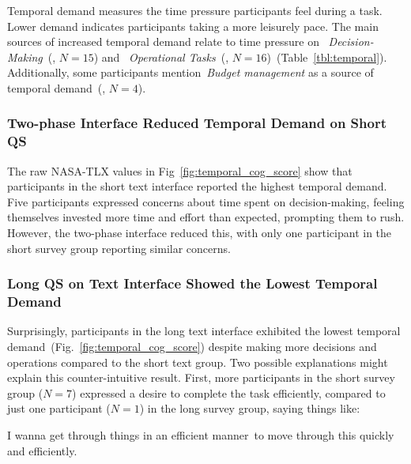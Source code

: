Temporal demand measures the time pressure participants feel during a task. Lower demand indicates participants taking a more leisurely pace. The main sources of increased temporal demand relate to time pressure on ~\textit{Decision-Making}~(, $N=15$) and ~\textit{Operational Tasks}~(, $N=16$)~(Table~\ref{tbl:temporal}). Additionally, some participants mention~\textit{Budget management} as a source of temporal demand~(, $N=4$).

\subsubsection{Two-phase Interface Reduced Temporal Demand on Short QS} The raw NASA-TLX values in Fig~\ref{fig:temporal_cog_score} show that participants in the short text interface reported the highest temporal demand. Five participants expressed concerns about time spent on decision-making, feeling themselves invested more time and effort than expected, prompting them to rush. However, the two-phase interface reduced this, with only one participant in the short survey group reporting similar concerns.

\subsubsection{Long QS on Text Interface Showed the Lowest Temporal Demand} 
Surprisingly, participants in the long text interface exhibited the lowest temporal demand~(Fig.~\ref{fig:temporal_cog_score}) despite making more decisions and operations compared to the short text group. Two possible explanations might explain this counter-intuitive result. First, more participants in the short survey group ($N=7$) expressed a desire to complete the task efficiently, compared to just one participant ($N=1$) in the long survey group, saying things like:

\begin{displayquote}
I wanna get through things in an efficient manner~\bracketellipsis to move through this quickly and efficiently. \hfill{}
\end{displayquote}

